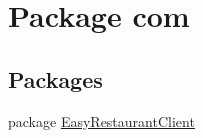 \hypertarget{namespacecom}{}\section{Package com}
\label{namespacecom}
\subsection*{Packages}
\begin{DoxyCompactItemize}
\item 
package \mbox{\hyperlink{namespacecom_1_1_easy_restaurant_client}{Easy\+Restaurant\+Client}}
\end{DoxyCompactItemize}

